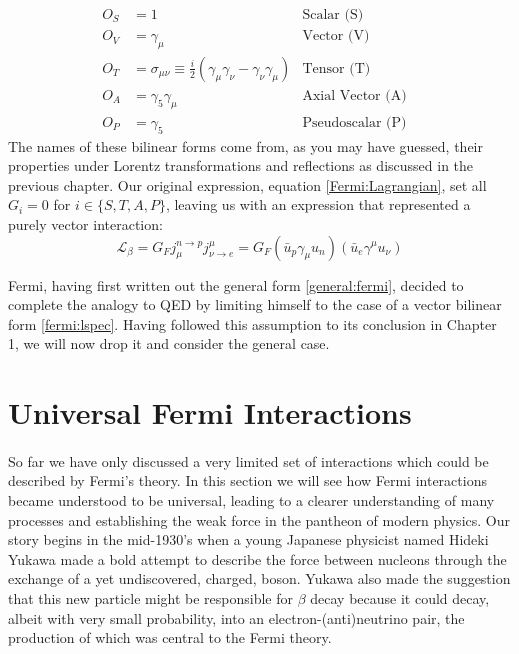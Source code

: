 \documentclass[a4paper,12pt]{book}
\begin{document}
\begin{align}\label{bilin}
O_{S} & = 1 & 
	\text{Scalar (S)} & \\
O_{V} & = \gamma_{\mu} & 
	\text{Vector (V)} & \\
O_{T} & = \sigma_{\mu \nu} \equiv \frac{i}{2}\left(\gamma_{\mu}\gamma_{\nu}-\gamma_{\nu}\gamma_{\mu}\right) &
	 \text{Tensor (T)} & \\
O_{A} & = \gamma_{5}\gamma_{\mu} & 
	\text{Axial Vector (A)} & \\
O_{P} & = \gamma_{5} & 
	\text{Pseudoscalar (P)} &
\end{align}
The names of these bilinear forms come from, as you may have guessed, their properties under Lorentz transformations and reflections as discussed in the previous chapter. Our original expression, equation \ref{Fermi:Lagrangian}, set all $G_{i}=0$ for $i\in \{S, T, A, P\}$, leaving us with an expression that represented a purely vector interaction:
\begin{equation}\label{fermi:lspec}
 \mathcal{L}_{\beta}=G_{F}j_{\mu}^{n\rightarrow p}j_{\nu \rightarrow e}^{\mu}=G_{F}\left(\bar{u}_{p}\gamma_{\mu} u_{n}\right)\left(\bar{u}_{e}\gamma^{\mu} u_{\nu}\right)
\end{equation}

Fermi, having first written out the general form \ref{general:fermi}, decided to complete the analogy to QED by limiting himself to the case of a vector bilinear form \ref{fermi:lspec}. Having followed this assumption to its conclusion in Chapter 1, we will now drop it and consider the general case.

\section{Universal Fermi Interactions}

\paragraph{}So far we have only discussed a very limited set of interactions which could be described by Fermi's theory. In this section we will see how Fermi interactions became understood to be universal, leading to a clearer understanding of many processes and establishing the weak force in the pantheon of modern physics. Our story begins in the mid-1930's when a young Japanese physicist named Hideki Yukawa made a bold attempt to describe the force between nucleons through the exchange of a yet undiscovered, charged, boson\cite{yukawa}. Yukawa also made the suggestion that this new particle might be responsible for $\beta$ decay because it could decay, albeit with very small probability, into an electron-(anti)neutrino pair, the production of which was central to the Fermi theory.
\end{document}
